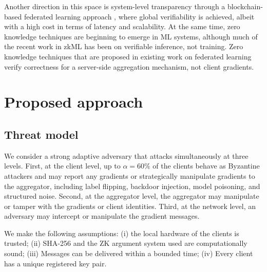 \documentclass[10pt,twocolumn,letterpaper]{article}
\begin{document}
Another direction in this space is system-level transparency through a blockchain-based federated learning approach \cite{kim2020blockchained}, where global verifiability is achieved, albeit with a high cost in terms of latency and scalability. At the same time, zero knowledge techniques are beginning to emerge in ML systems, although much of the recent work in zkML has been on verifiable inference, not training. Zero knowledge techniques that are proposed in existing work on federated learning verify correctness for a server-side aggregation mechanism, not client gradients.

\section{Proposed approach}
\label{sec:approach}

\subsection{Threat model}
\label{sec:threat}

We consider a strong adaptive adversary that attacks simultaneously at three levels. First, at the client level, up to $\alpha = 60\%$ of the clients behave as Byzantine attackers and may report any gradients or strategically manipulate gradients to the aggregator, including label flipping, backdoor injection, model poisoning, and structured noise. Second, at the aggregator level, the aggregator may manipulate or tamper with the gradients or client identities. Third, at the network level, an adversary may intercept or manipulate the gradient messages.

We make the following assumptions:
(i) the local hardware of the clients is trusted;
(ii) SHA-256 and the ZK argument system used are computationally sound;
(iii) Messages can be delivered within a bounded time;
(iv) Every client has a unique registered key pair.
\end{document}
